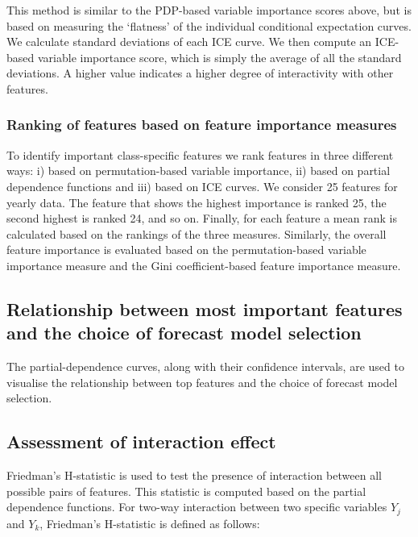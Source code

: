 \documentclass[11pt,a4paper,]{article}
\begin{document}
This method is similar to the PDP-based variable importance scores above, but is based on measuring the `flatness' of the individual conditional expectation curves. We calculate standard deviations of each ICE curve. We then compute an ICE-based variable importance score, which is simply the average of all the standard deviations. A higher value indicates a higher degree of interactivity with other features.

\hypertarget{ranking-of-features-based-on-feature-importance-measures}{%
\subsubsection{Ranking of features based on feature importance measures}\label{ranking-of-features-based-on-feature-importance-measures}}

To identify important class-specific features we rank features in three different ways: i) based on permutation-based variable importance, ii) based on partial dependence functions and iii) based on ICE curves. We consider 25 features for yearly data. The feature that shows the highest importance is ranked 25, the second highest is ranked 24, and so on. Finally, for each feature a mean rank is calculated based on the rankings of the three measures. Similarly, the overall feature importance is evaluated based on the permutation-based variable importance measure and the Gini coefficient-based feature importance measure.

\hypertarget{relationship-between-most-important-features-and-the-choice-of-forecast-model-selection}{%
\subsection{Relationship between most important features and the choice of forecast model selection}\label{relationship-between-most-important-features-and-the-choice-of-forecast-model-selection}}

The partial-dependence curves, along with their confidence intervals, are used to visualise the relationship between top features and the choice of forecast model selection.

\hypertarget{assessment-of-interaction-effect}{%
\subsection{Assessment of interaction effect}\label{assessment-of-interaction-effect}}

Friedman's H-statistic \autocite{friedman2008predictive} is used to test the presence of interaction between all possible pairs of features. This statistic is computed based on the partial dependence functions. For two-way interaction between two specific variables \(Y_j\) and \(Y_k\), Friedman's H-statistic is defined as follows:
\end{document}
